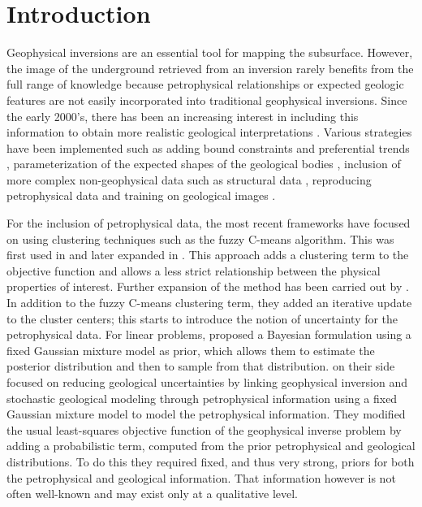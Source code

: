 \documentclass[extra]{gji} %
\begin{document}
\section{Introduction}

Geophysical inversions are an essential tool for mapping the subsurface. However, the image of the underground retrieved from an inversion rarely benefits from the full range of knowledge because petrophysical relationships or expected geologic features are not easily incorporated into traditional geophysical inversions. Since the early 2000's, there has been an increasing interest in including this information to obtain more realistic geological interpretations \citep{Linde2015,Moorkamp2016}. Various strategies have been implemented such as adding bound constraints and preferential trends \citep{Astic2018,Lelievre2009,Li2000,Williams_2008}, parameterization of the expected shapes of the geological bodies \citep{Fullagar2008,McMillan2015}, inclusion of more complex non-geophysical data such as structural data \citep{Wu2017}, reproducing petrophysical data \citep{Bosch2009,Grana2010,Sun2015,Zhdanov} and training on geological images \citep{Lochbuhler2015}.

For the inclusion of petrophysical data, the most recent frameworks have focused on using clustering techniques such as the fuzzy C-means algorithm. This was first used in \cite{Paasche2007} and later expanded in \cite{Lelievre2012}. This approach adds a clustering term to the objective function and allows a less strict relationship between the physical properties of interest. Further expansion of the method has been carried out by \cite{Sun2015, Sun2016, Sun2017}. In addition to the fuzzy C-means clustering term, they added an iterative update to the cluster centers; this starts to introduce the notion of uncertainty for the petrophysical data.
For linear problems, \cite{Grana2017} proposed a Bayesian formulation using a fixed Gaussian mixture model as prior, which allows them to estimate the posterior distribution and then to sample from that distribution.
\cite{Giraud2017} on their side focused on reducing geological uncertainties by linking geophysical inversion and stochastic geological modeling through petrophysical information using a fixed Gaussian mixture model to model the petrophysical information. They modified the usual least-squares objective function of the geophysical inverse problem by adding a probabilistic term, computed from the prior petrophysical and geological distributions. To do this they required fixed, and thus very strong, priors for both the petrophysical and geological information. That information however is not often well-known and may exist only at a qualitative level.
\end{document}
